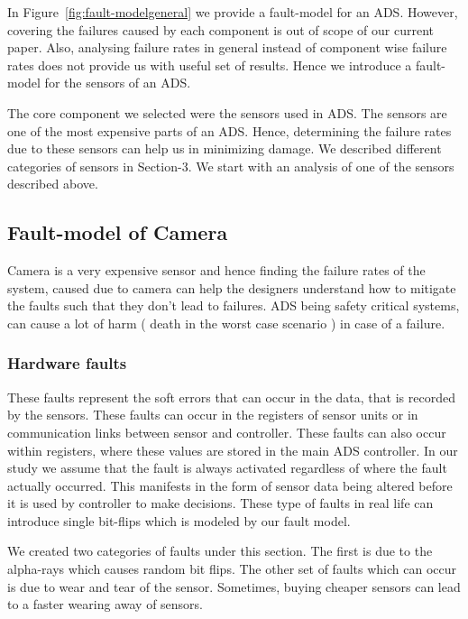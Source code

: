 




In Figure~\ref{fig:fault-modelgeneral} we provide a fault-model for an ADS. However, covering the failures caused by each component is out of scope of our current paper. Also, analysing failure rates in general instead of component wise failure rates does not provide us with useful set of results. Hence we introduce a fault-model for the sensors of an ADS. 

 The core component we selected were the  sensors used in ADS. The sensors are one of the most expensive parts of an ADS. Hence, determining the failure rates due to these sensors can help us in minimizing damage. We described different categories of sensors in Section-3. We start with an analysis of one of the sensors described above.
 
 \subsection{Fault-model of Camera}
 Camera is a very expensive sensor and hence finding the failure rates of the system, caused due to camera can help the designers understand how to mitigate the faults such that they don't lead to failures. ADS being safety critical systems, can cause a lot of harm ( death in the worst case scenario ) in case of a failure. 
 
 \subsubsection{Hardware faults} These faults represent the soft errors that can occur in the data, that is recorded by the sensors. These faults can occur in the registers of sensor units or in communication links between sensor and controller. These faults can also occur within registers, where these values are stored in the main ADS controller. In our study we  assume that the fault is always activated regardless of where the fault actually occurred. This manifests in the form of sensor data being altered before it is used by controller to make decisions. These type of faults in real life can introduce single bit-flips which is modeled by our fault model. 

 We created two categories of faults under this section. The first is due to the alpha-rays which causes random bit flips. The other set of faults which can occur is due to wear and tear of the sensor. Sometimes, buying cheaper sensors can lead to a faster wearing away of sensors. 
 \medskip
